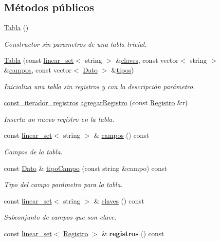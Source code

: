 \subsection*{Métodos públicos}
\begin{DoxyCompactItemize}
\item 
\hyperlink{classTabla_aa06ea30404464606d6f3b71c66a78809}{Tabla} ()
\begin{DoxyCompactList}\small\item\em Constructor sin parametros de una tabla trivial. \end{DoxyCompactList}\item 
\hyperlink{classTabla_a5a7be353082561e06a877b2255c0ea5c}{Tabla} (const \hyperlink{classlinear__set}{linear\-\_\-set}$<$ string $>$ \&\hyperlink{classTabla_aaea7c833fd1f68742785482809c8667a}{claves}, const vector$<$ string $>$ \&\hyperlink{classTabla_a3436d172652646a83d8035d1c68b9073}{campos}, const vector$<$ \hyperlink{classDato}{Dato} $>$ \&\hyperlink{classTabla_a6d13f7fd32f4ea1eb9f8cf3bdbeb9439}{tipos})
\begin{DoxyCompactList}\small\item\em Inicializa una tabla sin registros y con la descripción parámetro. \end{DoxyCompactList}\item 
\hyperlink{classTabla_1_1const__iterador__registros}{const\-\_\-iterador\-\_\-registros} \hyperlink{classTabla_a99345e41702e7e9984732c6f3672e386}{agregar\-Registro} (const \hyperlink{classRegistro}{Registro} \&r)
\begin{DoxyCompactList}\small\item\em Inserta un nuevo registro en la tabla. \end{DoxyCompactList}\item 
const \hyperlink{classlinear__set}{linear\-\_\-set}$<$ string $>$ \& \hyperlink{classTabla_a3436d172652646a83d8035d1c68b9073}{campos} () const 
\begin{DoxyCompactList}\small\item\em Campos de la tabla. \end{DoxyCompactList}\item 
const \hyperlink{classDato}{Dato} \& \hyperlink{classTabla_a256a50a84ffbf43b570c568bcaf5f52f}{tipo\-Campo} (const string \&campo) const 
\begin{DoxyCompactList}\small\item\em Tipo del campo parámetro para la tabla. \end{DoxyCompactList}\item 
const \hyperlink{classlinear__set}{linear\-\_\-set}$<$ string $>$ \& \hyperlink{classTabla_aaea7c833fd1f68742785482809c8667a}{claves} () const 
\begin{DoxyCompactList}\small\item\em Subconjunto de campos que son clave. \end{DoxyCompactList}\item 
\hypertarget{classTabla_a7bcdeb00d2fe040e454468d526cce66c}{const \hyperlink{classlinear__set}{linear\-\_\-set}$<$ \hyperlink{classRegistro}{Registro} $>$ \& {\bfseries registros} () const }\label{classTabla_a7bcdeb00d2fe040e454468d526cce66c}


\end{DoxyCompactItemize}
